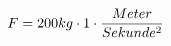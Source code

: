 \documentclass[preview]{standalone}
\begin{document}
\begin{align*}
\special{dvisvgm:raw <g id='unique000'>}F = 200kg \cdot 1 \cdot \frac{Meter}{Sekunde^{2}}\special{dvisvgm:raw </g>}
\end{align*}
\end{document}

